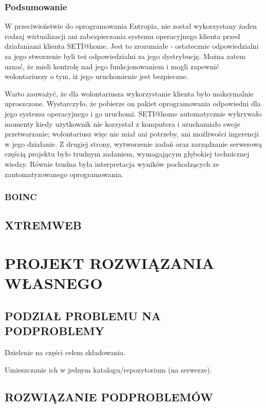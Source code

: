 \documentclass[12pt,a4paper,twoside]{article}
\begin{document}
\subsubsection{Podsumowanie}

W przeciwieństwie do oprogramowania Entropia, nie został wykorzystany żaden rodzaj wirtualizacji ani zabezpieczania systemu operacyjnego klienta przed działaniami klienta SETI@home. Jest to zrozumiałe - ostatecznie odpowiedzialni za jego stworzenie byli też odpowiedzialni za jego dystrybucję. Można zatem uznać, że mieli kontrolę nad jego funkcjonowaniem i mogli zapewnić wolontariuszy o tym, iż jego uruchomienie jest bezpieczne.

Warto zauważyć, że dla wolontariusza wykorzystanie klienta było maksymalnie uproszczone. Wystarczyło, że pobierze on pakiet oprogramowania odpowiedni dla jego systemu operacyjnego i go uruchomi. SETI@home automatycznie wykrywało momenty kiedy użytkownik nie korzystał z komputera i uruchamiało swoje przetwarzanie; wolontariusz więc nie miał ani potrzeby, ani możliwości ingerencji w jego działanie. Z drugiej strony, wytworzenie zadań oraz zarządzanie serwerową częścią projektu było trudnym zadaniem, wymagającym głębokiej technicznej wiedzy. Równie trudna była interpretacja wyników pochodzących ze zautomatyzowanego oprogramowania.

\subsubsection{BOINC}

\subsection{XTREMWEB}

\section{PROJEKT ROZWIĄZANIA WŁASNEGO}

\subsection{PODZIAŁ PROBLEMU NA PODPROBLEMY}

Dzielenie na części celem składowania. 

Umieszczanie ich w jednym katalogu/repozytorium (na serwerze).

\subsection{ROZWIĄZANIE PODPROBLEMÓW}
\end{document}
